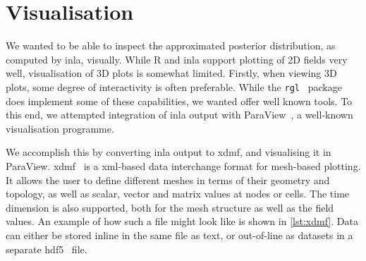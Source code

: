 \documentclass[british]{scrreprt}
\begin{document}
\section{Visualisation}
\label{sec:visualisation}
We wanted to be able to inspect the approximated posterior distribution, as computed by \gls{inla}, visually. While R and \gls{inla} support plotting of 2D fields very well, visualisation of 3D plots is somewhat limited. Firstly, when viewing 3D plots, some degree of interactivity is often preferable. While the \texttt{rgl}~\cite{MurdochRGL3Dvisualization2022} package does implement some of these capabilities, we wanted offer well known tools. To this end, we attempted integration of \gls{inla} output with ParaView~\cite{ParaView}, a well-known visualisation programme.

We accomplish this by converting \gls{inla} output to \gls{xdmf}, and visualising it in ParaView. \gls{xdmf}~\cite{XDMF} is a \gls{xml}-based data interchange format for mesh-based plotting. It allows the user to define different meshes in terms of their geometry and topology, as well as scalar, vector and matrix values at nodes or cells. The time dimension is also supported, both for the mesh structure as well as the field values. An example of how such a file might look like is shown in \cref{lst:xdmf}. Data can either be stored inline in the same file as text, or out-of-line as datasets in a separate \gls{hdf5}~\cite{HDF5LibraryFile} file.
\end{document}
